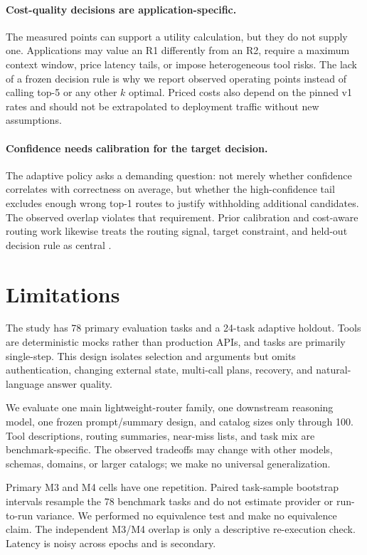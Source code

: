\documentclass[10pt,twocolumn]{article}
\begin{document}
\paragraph{Cost-quality decisions are application-specific.}
The measured points can support a utility calculation, but they do not supply one. Applications may value an R1 differently from an R2, require a maximum context window, price latency tails, or impose heterogeneous tool risks. The lack of a frozen decision rule is why we report observed operating points instead of calling top-5 or any other $k$ optimal. Priced costs also depend on the pinned v1 rates and should not be extrapolated to deployment traffic without new assumptions.

\paragraph{Confidence needs calibration for the target decision.}
The adaptive policy asks a demanding question: not merely whether confidence correlates with correctness on average, but whether the high-confidence tail excludes enough wrong top-1 routes to justify withholding additional candidates. The observed overlap violates that requirement. Prior calibration and cost-aware routing work likewise treats the routing signal, target constraint, and held-out decision rule as central \cite{guo2017calibration,chen2023frugalgpt,ong2024routellm,kotte2026ucci}.

\section{Limitations}

The study has 78 primary evaluation tasks and a 24-task adaptive holdout. Tools are deterministic mocks rather than production APIs, and tasks are primarily single-step. This design isolates selection and arguments but omits authentication, changing external state, multi-call plans, recovery, and natural-language answer quality.

We evaluate one main lightweight-router family, one downstream reasoning model, one frozen prompt/summary design, and catalog sizes only through 100. Tool descriptions, routing summaries, near-miss lists, and task mix are benchmark-specific. The observed tradeoffs may change with other models, schemas, domains, or larger catalogs; we make no universal generalization.

Primary M3 and M4 cells have one repetition. Paired task-sample bootstrap intervals resample the 78 benchmark tasks and do not estimate provider or run-to-run variance. We performed no equivalence test and make no equivalence claim. The independent M3/M4 overlap is only a descriptive re-execution check. Latency is noisy across epochs and is secondary.
\end{document}
